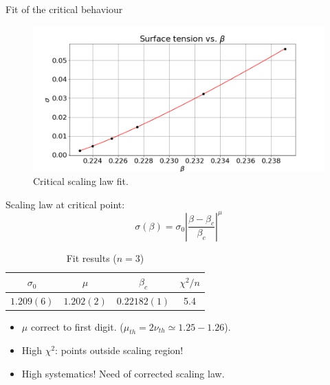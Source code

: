 \documentclass[12pt,handout]{beamer}
\begin{document}
\begin{frame}{Fit of the critical behaviour}
\begin{center}
\begin{figure}
\centering
\includegraphics[scale=0.4, center]{sbeta.png}
\caption{Critical scaling law fit.\label{fig:scalinglaw}}
\end{figure}

\end{center}
\end{frame}

\begin{frame}
\begin{center}
Scaling law at critical point:
\[
\sigma\left(\beta \right) = \sigma_0\left|\frac{\beta - \beta_c}{\beta_c} \right|^{\mu}
\]

\begin{table}[!htb]
\centering
\begin{tabular}{|c|c|c|c|}
\hline
$\sigma_0$ & $\mu$ & $\beta_c$ & $\chi^2 /n$\\
\hline
$1.209(6)$ & $1.202(2)$ & $0.22182(1)$ & 5.4\\
\hline
\end{tabular}
\caption{Fit results ($n = 3$)\label{tab:fitfinal}}
\end{table}

\begin{itemize}
\item $\mu$ correct to first digit. ($\mu_{th} = 2\nu_{th} \simeq 1.25-1.26$). %
\item High $\chi ^2$: points outside scaling region!
\item High systematics! Need of corrected scaling law.
\end{itemize}
\end{center}
\end{frame}
\end{document}
